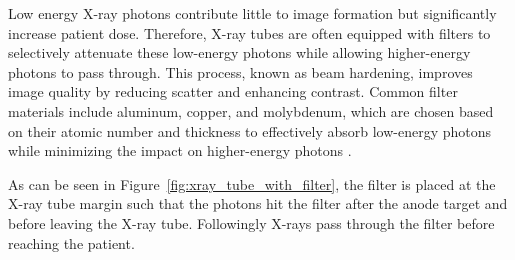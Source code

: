 Low energy X-ray photons contribute little to image formation but significantly
increase patient dose. Therefore, X-ray tubes are often equipped with filters to
selectively attenuate these low-energy photons while allowing higher-energy
photons to pass through. This process, known as beam hardening, improves image
quality by reducing scatter and enhancing contrast. Common filter materials
include aluminum, copper, and molybdenum, which are chosen based on their atomic
number and thickness to effectively absorb low-energy photons while minimizing
the impact on higher-energy photons \cite{poludniowski2022calculating}.

As can be seen in Figure~\ref{fig:xray_tube_with_filter}, the filter is placed
at the X-ray tube margin such that the photons hit the filter after the anode
target and before leaving the X-ray tube. Followingly X-rays pass through the
filter before reaching the patient.

